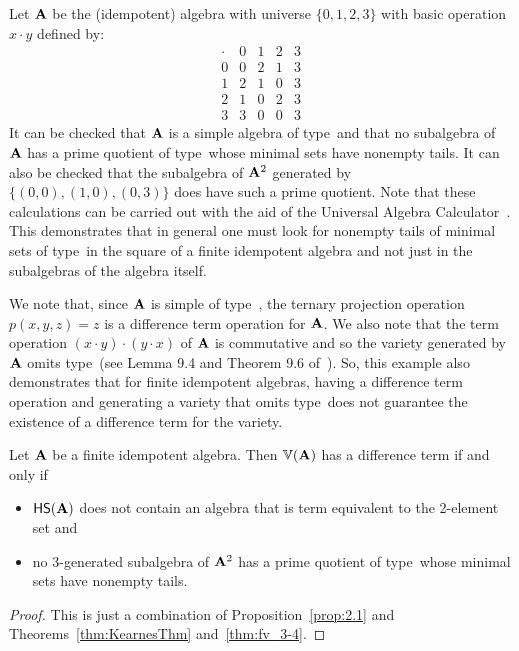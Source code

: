 \documentclass{ws-ijac}
\begin{document}
\begin{example}\label{alg:nodiff}
Let $\mathbf{A}$ be the (idempotent) algebra with universe $\{0,1,2, 3\}$ with basic operation $x\cdot y$ defined by:
  \[
  \begin{array}{c|cccc}
  \cdot&0&1&2&3\\\hline
  0&0&2&1&3\\
  1&2&1&0&3\\
  2&1&0&2&3\\
  3&3&0&0&3
  \end{array}
  \]
It can be checked that $\mathbf{A}$ is a simple algebra of type~\btyp and that no subalgebra of $\mathbf{A}$ has a prime quotient of type~\atyp whose minimal sets have nonempty tails.  It can also be checked that the subalgebra of $\mathbf{A}^2$ generated by $\{(0,0), (1,0), (0,3)\}$ does have such a prime quotient.
Note that these calculations can be carried out with the aid of the Universal Algebra Calculator~\cite{UACalc}.
This demonstrates that in general one must look for nonempty tails of minimal sets of type~\atyp in the square of a finite idempotent algebra and not just in the subalgebras of the algebra itself.

We note that, since $\mathbf{A}$ is simple of type~\btyp, the ternary projection operation $p(x,y,z ) = z$ is a difference term operation for $\mathbf{A}$.  We also note that the term operation $(x\cdot y) \cdot(y \cdot x)$ of $\mathbf{A}$ is commutative and so the variety generated by $\mathbf{A}$ omits type~\utyp (see Lemma 9.4 and Theorem 9.6 of~\cite{HM:1988}).  So, this example also demonstrates that for finite idempotent algebras, having a difference term operation and generating a variety that omits type~\utyp does not guarantee the existence of a difference term for the variety.
\end{example}

\begin{corollary}\label{cor:diffterm}
  Let $\mathbf{A}$ be a finite idempotent algebra.  Then $\operatorname{\mathbb{V}}(\mathbf{A})$ has a difference term if and only if
  \begin{itemize}
  \item $\mathsf{H} \mathsf{S} (\mathbf{A})$ does not contain an algebra that is term equivalent to the 2-element set and
      \item no 3-generated subalgebra of $\mathbf{A}^2$ has a prime quotient of type~\atyp whose minimal sets have nonempty tails.
  \end{itemize}
\end{corollary}

\begin{proof}
  This is just a combination of Proposition~\ref{prop:2.1} and Theorems~\ref{thm:KearnesThm} and~\ref{thm:fv_3-4}.
\end{proof}
\end{document}
